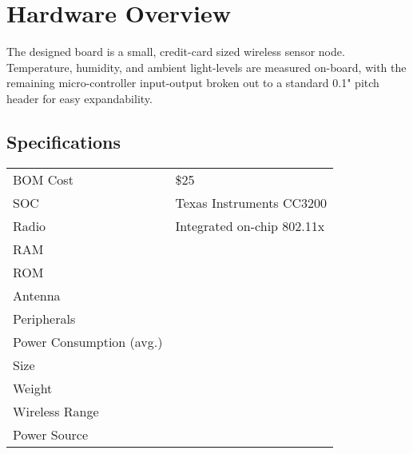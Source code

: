\chapter{Hardware Overview}

The designed board is a small, credit-card sized wireless sensor node. Temperature, humidity, and ambient light-levels are measured on-board, with the remaining micro-controller input-output broken out to a standard 0.1" pitch header for easy expandability. 

\section{Specifications}

\begin{table}[h]
	\centering
	\begin{tabular}{l|l}
		BOM Cost                 & \$25                       \\
		SOC                      & Texas Instruments CC3200   \\
		Radio                    & Integrated on-chip 802.11x \\
		RAM                      &                            \\
		ROM                      &                            \\
		Antenna                  &                            \\
		Peripherals              &                            \\
		Power Consumption (avg.) &                            \\
		Size                     &                            \\
		Weight                   &                            \\
		Wireless Range           &                            \\
		Power Source             &                           
	\end{tabular}
\end{table}